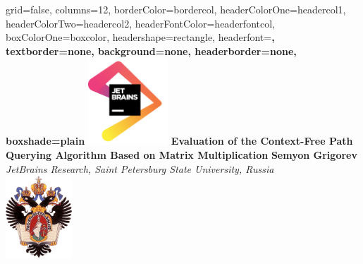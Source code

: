 \documentclass[a0paper,portrait]{baposter}
\begin{document}
\setlength{\fboxsep}{0pt}


\begin{poster}{
grid=false,
columns=12, %
borderColor=bordercol, %
headerColorOne=headercol1, %
headerColorTwo=headercol2, %
headerFontColor=headerfontcol, %
boxColorOne=boxcolor, %
headershape=rectangle, %
headerfont=\Large\sf\bf, %
textborder=none,
background=none,
headerborder=none, %
boxshade=plain
}
{\includegraphics[width=3cm]{jetbrains.png}}
%
%
{\bf \huge{Evaluation of the Context-Free Path Querying Algorithm Based on Matrix Multiplication} }
{\vspace{0.6em} \smaller \textbf{Semyon Grigorev} \\  %
\smaller \it {JetBrains Research, Saint Petersburg State University, Russia } \\ %
}
{\includegraphics[width=2.5cm]{SPbGU_Logo.png}} %



\end{poster}
\end{document}
